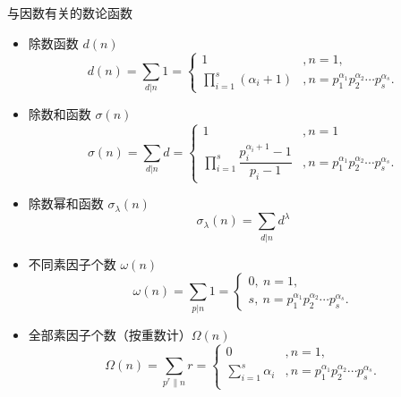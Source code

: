 \begin{example}{与因数有关的数论函数}
\begin{itemize}
\item 除数函数 $d(n)$
\begin{equation}
d(n)=\sum_{d|n} 1=
\begin{cases}
1&,n=1,\\
\prod\limits_{i=1}^{s}(\alpha_i+1)&,n=p_1^{\alpha_1}p_2^{\alpha_2}\cdots p_s^{\alpha_s}.
\end{cases}
\end{equation}
\item 除数和函数 $\sigma(n)$
\begin{equation}
\sigma(n)=\sum_{d|n}d=
\begin{cases}
1&,n=1\\
\prod\limits_{i=1}^{s}\dfrac{p_i^{\alpha_i+1}-1}{p_i-1}&,n=p_1^{\alpha_1}p_2^{\alpha_2}\cdots p_s^{\alpha_s}.
\end{cases}
\end{equation}
\item 除数幂和函数 $\sigma_\lambda(n)$
\begin{equation}
\sigma_\lambda(n)=\sum_{d|n}d^\lambda
\end{equation}
\item 不同素因子个数 $\omega(n)$
\begin{equation}
\omega(n)=\sum_{p|n}1=
\begin{cases}
0,\ n=1,\\
s,\ n=p_1^{\alpha_1}p_2^{\alpha_2}\cdots p_s^{\alpha_s}.
\end{cases}
\end{equation}
\item 全部素因子个数（按重数计）$\Omega(n)$
\begin{equation}
\Omega(n)=\sum_{p^r\|n}r=
\begin{cases}
0&,n=1,\\
\sum\limits_{i=1}^{s}\alpha_i&,n=p_1^{\alpha_1}p_2^{\alpha_2}\cdots p_s^{\alpha_s}.\\
\end{cases}
\end{equation}
\end{itemize}
\end{example}
